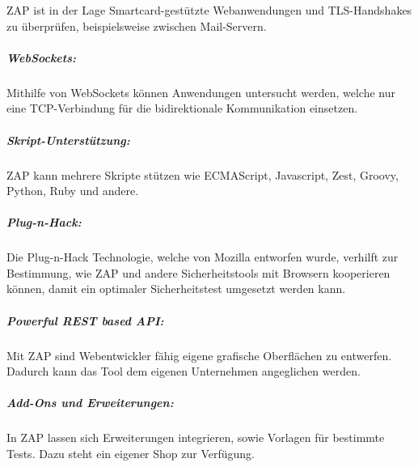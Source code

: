 ZAP ist in der Lage Smartcard-gestützte Webanwendungen und TLS-Handshakes zu überprüfen, beispielsweise zwischen Mail-Servern.

\subparagraph{WebSockets:}

Mithilfe von WebSockets können Anwendungen untersucht werden, welche nur eine TCP-Verbindung für die bidirektionale Kommunikation einsetzen. 

\subparagraph{Skript-Unterstützung:}

ZAP kann mehrere Skripte stützen wie ECMAScript, Javascript, Zest, Groovy,  Python, Ruby und andere. 

\subparagraph{Plug-n-Hack:}

Die Plug-n-Hack Technologie, welche von Mozilla entworfen wurde, verhilft zur Bestimmung, wie ZAP und andere Sicherheitstools mit Browsern kooperieren können, damit ein optimaler Sicherheitstest umgesetzt werden kann. 

\subparagraph{Powerful REST based API:}

Mit ZAP sind Webentwickler fähig eigene grafische Oberflächen zu entwerfen. Dadurch kann das Tool dem eigenen Unternehmen angeglichen werden. 

\subparagraph{Add-Ons und Erweiterungen:}

In ZAP lassen sich Erweiterungen integrieren, sowie Vorlagen für bestimmte Tests. Dazu steht ein eigener Shop zur Verfügung.
